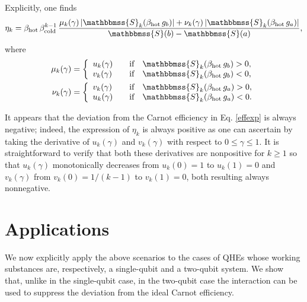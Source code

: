 \documentclass[aps,pra,floatfix,twocolumn,groupedaddress,superscriptaddress,nofootinbib,notitlepage,amsmath,amssymb,]{revtex4-1}
\begin{document}
Explicitly, one finds
\begin{equation}
\label{genform}
\eta_{k}=\beta_{\mathrm{hot}}\,\beta_{\mathrm{cold}}^{k -1}\,\frac{\mu_{k}(\gamma)\left|\mathbbmss{S}_{k}(\beta_{\mathrm{hot}} \, g_b)\right|+\nu_{k}(\gamma)\left|\mathbbmss{S}_{k}(\beta_{\mathrm{hot}}\, g_a)\right|}{\mathbbmss{S}(b)-\mathbbmss{S}(a)},
\end{equation}
where
\begin{align}
	\mu_{k}(\gamma)&=\left\{
	\begin{array}{ll}
		u_{k}(\gamma) &\quad\hbox{if}\quad \mathbbmss{S}_{k}(\beta_{\mathrm{hot}}\, g_b)>0,\\
		v_{k}(\gamma) &\quad\hbox{if}\quad \mathbbmss{S}_{k}(\beta_{\mathrm{hot}}\, g_b)<0,
	\end{array}
	\right.\\
	\nu_{k}(\gamma)&=\left\{
	\begin{array}{ll}
		v_{k}(\gamma) &\quad\hbox{if}\quad  \mathbbmss{S}_{k}(\beta_{\mathrm{hot}}\, g_a)>0,\\
		u_{k}(\gamma) &\quad\hbox{if}\quad \mathbbmss{S}_{k}(\beta_{\mathrm{hot}}\, g_a)<0.
	\end{array}\right.
\end{align} 

It appears that the deviation from the Carnot efficiency in Eq. \eqref{effexp} is always negative; indeed, the expression of $\eta_{k}$ is always positive as one can ascertain by taking the derivative of $u_{k}(\gamma)$ and $v_{k}(\gamma)$ with respect to $0\leqslant \gamma\leqslant 1$. It is straightforward to verify that both these derivatives are nonpositive for $k\geqslant 1$ so that $u_{k}(\gamma)$ monotonically decreases from $u_{k}(0)=1$ to $u_{k}(1)=0$ and $v_{k}(\gamma)$ from $v_{k}(0)=1/(k -1)$ to $v_{k}(1)=0$, both resulting always nonnegative.

\section{Applications}
\label{sec:twolevel}

We now explicitly apply the above scenarios to the cases of QHEs whose working substances are, respectively, a single-qubit and a two-qubit system. We show that, unlike in the single-qubit case, in the two-qubit case the interaction can be used to suppress the deviation from the ideal Carnot efficiency.

\end{document}
